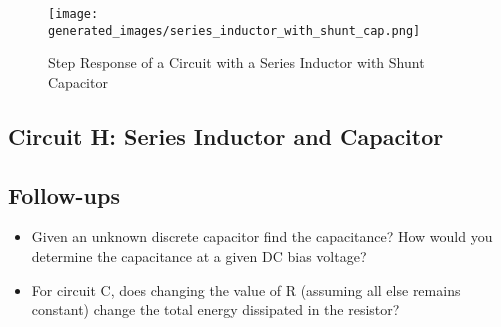 \documentclass[main.tex]{subfiles}
\begin{document}




\begin{figure}[H]
    \centering
    \texttt{[image: generated\_images/series\_inductor\_with\_shunt\_cap.png]}
    \caption{Step Response of a Circuit with a Series Inductor with Shunt Capacitor}
    \label{fig:step-response-series-ind-with-shunt-cap}
\end{figure}

\subsection{Circuit H: Series Inductor and Capacitor}


\subsection{Follow-ups}
\begin{itemize}
    \item Given an unknown discrete capacitor find the capacitance? How would you determine the capacitance at a given DC bias voltage? %
    \item For circuit C, does changing the value of R (assuming all else remains constant) change the total energy dissipated in the resistor? %
\end{itemize}
\end{document}
